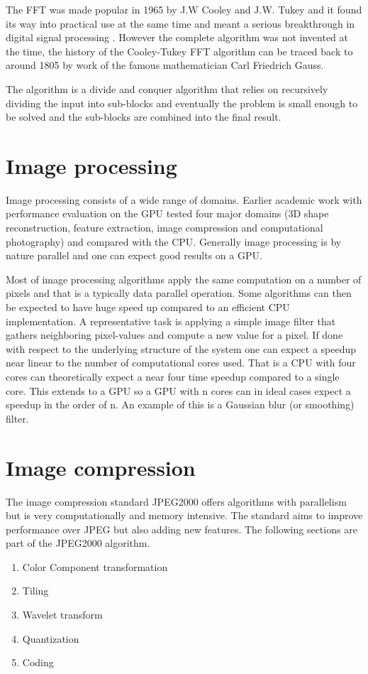 The FFT was made popular in 1965\cite{Cooley1965} by J.W Cooley and J.W. Tukey and it found its way into practical use at the same time and meant a serious breakthrough in digital signal processing \cite{Cooley1969, Brigham1967}. However the complete algorithm was not invented at the time, the history of the Cooley-Tukey FFT algorithm can be traced back to around 1805 by work of the famous mathematician Carl Friedrich Gauss\cite{Heideman1985}.

The algorithm is a divide and conquer algorithm that relies on recursively dividing the input into sub-blocks and eventually the problem is small enough to be solved and the sub-blocks are combined into the final result.
\section{Image processing}
Image processing consists of a wide range of domains. Earlier academic work with performance evaluation on the GPU\cite{Park2011} tested four major domains (3D shape reconstruction, feature extraction, image compression and computational photography) and compared with the CPU. Generally image processing is by nature parallel and one can expect good results on a GPU.

Most of image processing algorithms apply the same computation on a number of pixels and that is a typically data parallel operation. Some algorithms can then be expected to have huge speed up compared to an efficient CPU implementation. A representative task is applying a simple image filter that gathers neighboring pixel-values and compute a new value for a pixel. If done with respect to the underlying structure of the system one can expect a speedup near linear to the number of computational cores used. That is a CPU with four cores can theoretically expect a near four time speedup compared to a single core. This extends to a GPU so a GPU with n cores can in ideal cases expect a speedup in the order of n. An example of this is a Gaussian blur (or smoothing) filter.

\section{Image compression}
The image compression standard JPEG2000 offers algorithms with parallelism but is very computationally and memory intensive. The standard aims to improve performance over JPEG but also adding new features. The following sections are part of the JPEG2000 algorithm\cite{Christopoulos2000}.
\begin{enumerate}
	\item Color Component transformation
	\item Tiling
	\item Wavelet transform
	\item Quantization
	\item Coding
\end{enumerate}

